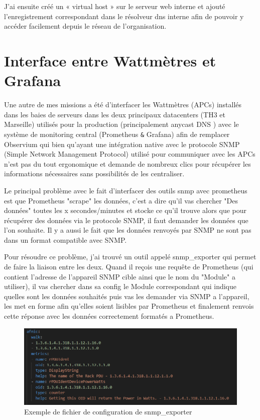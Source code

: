 J’ai ensuite créé un « virtual host » sur le serveur web interne et ajouté l’enregistrement correspondant dans le résolveur dns interne afin de pouvoir y accéder facilement depuis le réseau de l’organisation.

 
\section{Interface entre Wattmètres et Grafana}

Une autre de mes missions a été d’interfacer les Wattmètres (APCs) installés dans les baies de serveurs dans les deux principaux datacenters (TH3 et Marseille) utilisés pour la production (principalement \gls{anycast} DNS ) avec le système de monitoring central (Prometheus \verb|&| Grafana) afin de remplacer Observium qui bien qu'ayant une intégration native avec le protocole SNMP (Simple Network Management Protocol) utilisé pour communiquer avec les APCs n'est pas du tout ergonomique et demande de nombreux clics pour récupérer les informations nécessaires sans possibilités de les centraliser.

Le principal problème avec le fait d'interfacer des outils snmp avec prometheus est que Prometheus "\Gls{scrape}" les données, c'est a dire qu'il vas chercher "Des données" toutes les x secondes/minutes et stocke ce qu'il trouve alors que pour récupérer des données via le protocole SNMP, il faut demander les données que l'on souhaite. Il y a aussi le fait que les données renvoyés par SNMP ne sont pas dans un format compatible avec SNMP.

Pour résoudre ce problème, j'ai trouvé un outil appelé snmp\_exporter qui permet de faire la liaison entre les deux. Quand il reçois une requête de Prometheus (qui contient l'adresse de l'appareil SNMP cible ainsi que le nom du "Module" a utiliser), il vas chercher dans sa config le Module correspondant qui indique quelles sont les données souhaités puis vas les demander via SNMP a l'appareil, les met en forme afin qu'elles soient lisibles par Prometheus et finalement renvois cette réponse avec les données correctement formatés a Prometheus.


\begin{figure}[htbp]
  \centering
  \includegraphics[width=\textwidth]{paper/figures/exempleConfigSNMP.png}
  \caption{Exemple de fichier de configuration de snmp\_exporter}
  \label{fig:exempleConfigSNMP}
\end{figure}

